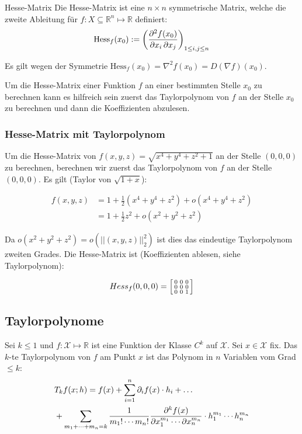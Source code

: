 \documentclass[a4paper,10pt]{article}
\def\R{\mathbb{R}}
\def\X{\mathcal{X}}
\begin{document}
\begin{mainbox}{Hesse-Matrix}
  Die Hesse-Matrix ist eine \(n \times n\) symmetrische Matrix, welche die zweite Ableitung für $f: X \subseteq \mathbb{R}^n \mapsto \mathbb{R}$ definiert:
  \[\text{Hess}_f(x_0) := \left(\pdv{f(x_0)}{x_i, x_j}\right)_{1\le i,j \le n}\] 
\end{mainbox}

Es gilt wegen der Symmetrie $\text{Hess}_f(x_0) = \nabla^2 f(x_0) = D(\nabla f)(x_0)$.

Um die Hesse-Matrix einer Funktion $f$ an einer bestimmten Stelle $x_0$ zu berechnen kann es hilfreich sein zuerst das Taylorpolynom von $f$ an der Stelle $x_0$ zu berechnen und dann die Koeffizienten abzulesen. 

\subsubsection*{Hesse-Matrix mit Taylorpolynom}

Um die Hesse-Matrix von $f(x, y,z) = \sqrt{x^4 + y^4 + z^2 + 1}$ an der Stelle $(0, 0, 0)$ zu berechnen, berechnen wir zuerst das Taylorpolynom von $f$ an der Stelle $(0, 0, 0)$. Es gilt (Taylor von $\sqrt{1 + x}$):

\begin{align*}
  f(x, y, z) & = 1 + \frac{1}{2}(x^4 + y^4 + z^2) + o(x^4 + y^4 + z^2)\\
  & = 1 + \frac{1}{2}z^2 + o(x^2 + y^2 + z^2)
\end{align*}

Da $o(x^2 + y^2 + z^2) = o(|| (x,y,z) ||_2^2)$ ist dies das eindeutige Taylorpolynom zweiten Grades. Die Hesse-Matrix ist (Koeffizienten ablesen, siehe Taylorpolynom):

$$Hess_f(0, 0, 0) = \begin{bsmallmatrix}
  0 & 0 & 0 \\
  0 & 0 & 0 \\
  0 & 0 & 1
\end{bsmallmatrix}$$

\subsection{Taylorpolynome}
Sei \(k \le 1\) und \(f: \X \mapsto \R\) ist eine Funktion der Klasse \(C^k\) auf \(\X\). Sei \(x \in \X\) fix. Das \(k\)-te Taylorpolynom von \(f\) am Punkt \(x\) ist das Polynom in \(n\) Variablen vom Grad \(\le k\):
\begin{align*}
  &T_k f(x; h) = f(x) + \sum_{i=1}^n \partial_i f(x) \cdot h_i + \dots \\
  &+ \sum_{m_1 + \cdots + m_n = k} \frac{1}{m_1! \cdots m_n!} \pdv{^k f(x) }{x_1^{m_1} \cdots \partial x_n^{m_n}} \cdot h_1^{m_1} \cdots h_n^{m_n}
\end{align*}
\end{document}
